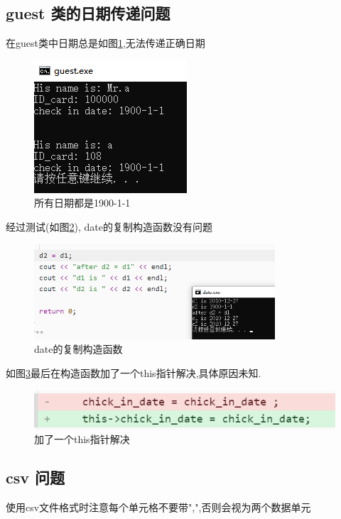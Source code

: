 \documentclass[UTF8]{ctexart}
\begin{document}
  \subsection{guest 类的日期传递问题}
    在guest类中日期总是如图\ref{fig:bug_4},无法传递正确日期
    \begin{figure}[H]
      \centering
      \includegraphics[scale = 1]{bug_4}
      \caption{所有日期都是1900-1-1}
      \label{fig:bug_4}
    \end{figure}
    经过测试(如图\ref{fig:bug_4_1}), date的复制构造函数没有问题
    \begin{figure}[H]
      \centering
      \includegraphics[width=0.8\textwidth]{bug_4_1}
      \caption{date的复制构造函数}
      \label{fig:bug_4_1}
    \end{figure}
    如图\ref{fig:bug_4_fix}最后在构造函数加了一个this指针解决,具体原因未知.
    \begin{figure}[H]
      \centering
      \includegraphics[scale = 1]{bug_4_fix}
      \caption{加了一个this指针解决}
      \label{fig:bug_4_fix}
    \end{figure}

  \subsection{csv 问题}
    使用csv文件格式时注意每个单元格不要带",",否则会视为两个数据单元
\end{document}
